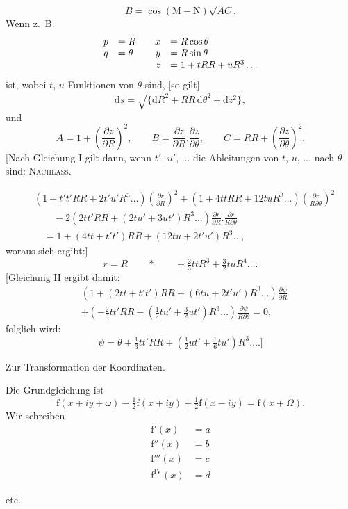 \[
B=\cos(\mathrm M-\mathrm N)\sqrt{AC}.
\]
Wenn z.~B.
\[
\begin{array}{rl@{\qquad}rl}
p&=R&x&=R\cos\theta\\
q&=\theta&y&=R\sin\theta\\
&&z&=1+tRR+uR^3\ldots
\end{array}
\]
ist, wobei $t$, $u$ Funktionen von $\theta$ sind, [so gilt]
\[
\mathrm ds=\sqrt{\{\mathrm dR^2+RR\,\mathrm d\theta^2+\mathrm dz^2\}},
\]
und
\[
A=1+\left(\frac{\partial z}{\partial R}\right)^2,\qquad
B=\frac{\partial z}{\partial R}.\frac{\partial z}{\partial\theta},\qquad
C=RR+\left(\frac{\partial z}{\partial\theta}\right)^2.
\]
[Nach Gleichung I gilt dann, wenn $t'$, $u'$, $\ldots$ die Ableitungen von $t$, $u$, $\ldots$ nach $\theta$ sind:
\clearpage
{}\hfill\textsc{Nachlass.}\hfill\mbox{}\par\medskip
\begingroup\small
\[
\begin{aligned}
&(1+t't'RR+2t'u'R^3\ldots)\left(\frac{\partial r}{\partial R}\right)^2
+(1+4ttRR+12tuR^3\ldots)\left(\frac{\partial r}{R\partial\theta}\right)^2\\
&\qquad-2(2tt'RR+(2tu'+3ut')R^3\ldots)\frac{\partial r}{\partial R}.\frac{\partial r}{R\partial\theta}\\
&\quad=1+(4tt+t't')RR+(12tu+2t'u')R^3\ldots,
\end{aligned}
\]
woraus sich ergibt:]
\[
r=R\qquad\ast\qquad+\tfrac23ttR^3+\tfrac32tuR^4\ldots.
\]
[Gleichung II ergibt damit:
\[
\begin{aligned}
&(1+(2tt+t't')RR+(6tu+2t'u')R^3\ldots)\frac{\partial\psi}{\partial R}\\
&+(-\tfrac23tt'RR-(\tfrac12tu'+\tfrac32ut')R^3\ldots)\frac{\partial\psi}{R\partial\theta}=0,
\end{aligned}
\]
folglich wird:
\[
\psi=\theta+\tfrac13tt'RR+(\tfrac12ut'+\tfrac16tu')R^3\ldots.]
\]
\bigskip
\begin{center}
Zur Transformation der Koordinaten.\par\medskip
[18.]
\end{center}
Die Grundgleichung ist
\[
\mathrm f(x+iy+\omega)-\tfrac12\mathrm f(x+iy)+\tfrac12\mathrm f(x-iy)=\mathrm f(x+\Omega).
\]
Wir schreiben
\[
\begin{aligned}
\mathrm f'(x)&=a\\
\mathrm f''(x)&=b\\
\mathrm f'''(x)&=c\\
\mathrm f^{\mathrm{IV}}(x)&=d
\end{aligned}
\]
\begin{center}etc.\end{center}
